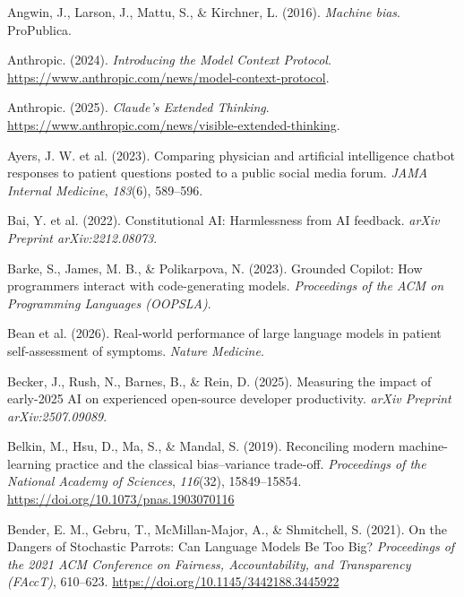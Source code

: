 \documentclass[
  letterpaper,
  11pt]{scrbook}
\newlength{\cslhangindent}
\newenvironment{CSLReferences}[2] %
 {\begin{list}{}{%
  \setlength{\itemindent}{0pt}
  \setlength{\leftmargin}{0pt}
  \setlength{\parsep}{0pt}
  \ifodd #1
   \setlength{\leftmargin}{\cslhangindent}
   \setlength{\itemindent}{-1\cslhangindent}
  \fi
  \setlength{\itemsep}{#2\baselineskip}}}
 {\end{list}}
\begin{document}
\protect{}\label{refs}
\begin{CSLReferences}{1}{0}
Angwin, J., Larson, J., Mattu, S., \& Kirchner, L. (2016). \emph{Machine
bias}. ProPublica.

Anthropic. (2024). \emph{{Introducing the Model Context Protocol}}.
\url{https://www.anthropic.com/news/model-context-protocol}.

Anthropic. (2025). \emph{{Claude's Extended Thinking}}.
\url{https://www.anthropic.com/news/visible-extended-thinking}.

{Ayers, J. W. et al.} (2023). Comparing physician and artificial
intelligence chatbot responses to patient questions posted to a public
social media forum. \emph{JAMA Internal Medicine}, \emph{183}(6),
589--596.

{Bai, Y. et al.} (2022). Constitutional {AI}: Harmlessness from {AI}
feedback. \emph{arXiv Preprint arXiv:2212.08073}.

Barke, S., James, M. B., \& Polikarpova, N. (2023). Grounded {Copilot}:
How programmers interact with code-generating models. \emph{Proceedings
of the ACM on Programming Languages (OOPSLA)}.

{Bean et al.} (2026). Real-world performance of large language models in
patient self-assessment of symptoms. \emph{Nature Medicine}.

Becker, J., Rush, N., Barnes, B., \& Rein, D. (2025). Measuring the
impact of early-2025 {AI} on experienced open-source developer
productivity. \emph{arXiv Preprint arXiv:2507.09089}.

Belkin, M., Hsu, D., Ma, S., \& Mandal, S. (2019). Reconciling modern
machine-learning practice and the classical bias--variance trade-off.
\emph{Proceedings of the National Academy of Sciences}, \emph{116}(32),
15849--15854. \url{https://doi.org/10.1073/pnas.1903070116}

Bender, E. M., Gebru, T., McMillan-Major, A., \& Shmitchell, S. (2021).
{On the Dangers of Stochastic Parrots}: {Can Language Models Be Too
Big?} \emph{Proceedings of the 2021 ACM Conference on Fairness,
Accountability, and Transparency (FAccT)}, 610--623.
\url{https://doi.org/10.1145/3442188.3445922}


\end{CSLReferences}
\end{document}
